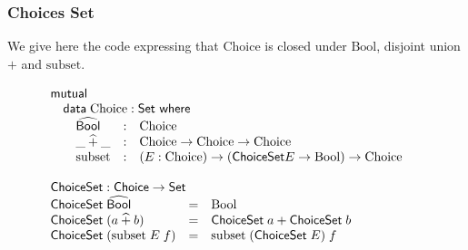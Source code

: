 \documentclass{beamer}
\newcommand{\ar}{\rightarrow}
\newcommand{\datarm}{\mathsf{data}}
\newcommand{\wheresf}{\mathsf{where}}
\newcommand{\Set}{\mathsf{Set}}
\newcommand{\mutual}{\mathsf{mutual}}
\newcommand{\Process}{\mathsf{Process}}
\newcommand{\Choice}{\mathsf{Choice}}
\newcommand{\ChoiceSet}{\mathsf{ChoiceSet}}
\newcommand{\Label}{\mathsf{Label}}
\newcommand{\node}{\mathsf{node}}
\newcommand{\terminate}{\mathsf{terminate}}
\newcommand{\Bool}{\mathrm{Bool}}
\newcommand{\Boolhat}{\widehat{\mathsf{Bool}}}
\newcommand{\plushat}{\mathbin{\widehat{+}}}
\newcommand{\Choi}{\mathrm{Choice}}
\newcommand{\subsett}{\mathrm{subset}}
\begin{document}
\begin{frame}
\frametitle{Choices Set}

We give here the code expressing that Choice is closed under $\Bool$, disjoint union $+$ and $\subsett$.



\[\begin{array}[t]{@{}l} 
\mutual\\
\mbox{\quad}
\begin{array}[t]{@{}l} 
\datarm\;\Choi : \Set\ \wheresf\\
\mbox{\quad} \begin{array}[t]{@{}lcl} 
\Boolhat &: & \Choi\\
\_\plushat\_ &:& \Choi \ar \Choi \ar \Choi\\
\subsett &:& (E : \Choi) \ar  (\ChoiceSet E \ar \Bool) \ar \Choi
\end{array} \end{array} \\
\\
\ChoiceSet : \Choice  \ar \Set \\
\begin{array}[t]{@{}lcl} 
\ChoiceSet\;\Boolhat &=& \Bool\\
\ChoiceSet\;(a \plushat b) &=& 
\ChoiceSet\;a + \ChoiceSet\;b \\
\ChoiceSet\;(\subsett\; E\; f) &=& \subsett\; (\ChoiceSet\; E)\; f

\end{array} 
\end{array} 
\]

\end{frame}





%
%
%
%
\end{document}
